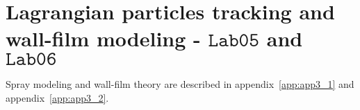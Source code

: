 
\section{Lagrangian particles tracking and wall-film modeling - $\mathtt{Lab05}$ and $\mathtt{Lab06}$}
    
    \renewcommand{\thepage}{\arabic{page}}
    \setcounter{page}{\thelastPage}
Spray modeling and wall-film theory are described in appendix~\ref{app:app3_1} and appendix~\ref{app:app3_2}.    
       
        
